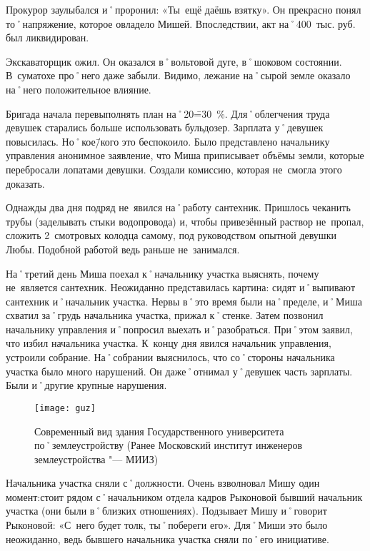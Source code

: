 Прокурор заулыбался и˚проронил: «Ты~ещё даёшь взятку». Он прекрасно понял то˚напряжение, которое овладело Мишей. Впоследствии, акт на˚400~тыс. руб. был ликвидирован.

Экскаваторщик ожил. Он оказался в˚вольтовой дуге, в˚шоковом состоянии. В~суматохе про˚него даже забыли. Видимо, лежание на˚сырой земле оказало на˚него положительное влияние. 

Бригада начала перевыполнять план на˚20\==30~\%. Для˚облегчения труда девушек старались больше использовать бульдозер. Зарплата у˚девушек повысилась. Но˚кое\=/кого это беспокоило. Было представлено начальнику управления анонимное заявление, что Миша приписывает объёмы земли, которые перебросали лопатами девушки. Создали комиссию, которая не~смогла этого доказать.

Однажды два дня подряд не~явился на˚работу сантехник. Пришлось чеканить трубы (заделывать стыки водопровода) и, чтобы привезённый раствор не~пропал, сложить 2~смотровых колодца самому, под руководством опытной девушки Любы. Подобной работой ведь раньше не~занимался.

На˚третий день Миша поехал к˚начальнику участка выяснять, почему не~является сантехник. Неожиданно представилась картина: сидят и˚выпивают сантехник и˚начальник участка. Нервы в˚это время были на˚пределе, и˚Миша схватил за˚грудь начальника участка, прижал к˚стенке. Затем позвонил начальнику управления и˚попросил выехать и˚разобраться. При˚этом заявил, что избил начальника участка. К~концу дня явился начальник управления, устроили собрание. На˚собрании выяснилось, что со˚стороны начальника участка было много нарушений. Он даже˚отнимал у˚девушек часть зарплаты. Были и˚другие крупные нарушения.

\begin{wrapfigure}{O}{.4\textwidth}
\centering
\texttt{[image: guz]}
\caption[Современный вид здания Государственного университета по˚землеустройству (Ранее Московский институт инженеров землеустройства "--- МИИЗ)]{Современный вид здания Государственного университета по˚землеустройству (Ранее Московский институт инженеров землеустройства "--- МИИЗ)\footnotemark}
\label{fig:guz}
\end{wrapfigure}

Начальника участка сняли с˚должности. Очень взволновал Мишу один момент:стоит рядом с˚начальником отдела кадров Рыконовой бывший начальник участка (они были в˚близких отношениях). Подзывает Мишу и˚говорит Рыконовой: «С~него будет толк, ты˚побереги его». Для˚Миши это было неожиданно, ведь бывшего начальника участка сняли по˚его инициативе. 

